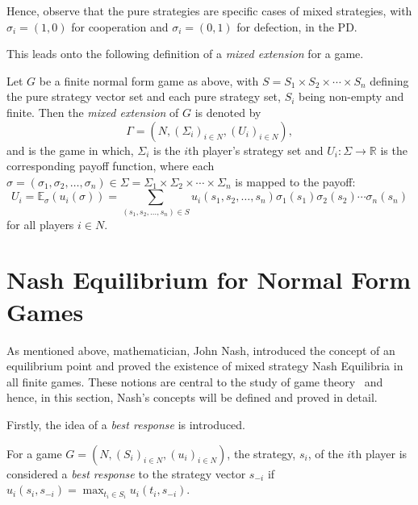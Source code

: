 Hence, observe that the pure
strategies are specific cases of mixed strategies, with \(\sigma_{i} = (1, 0)\)
for cooperation and \(\sigma_{i} = (0, 1)\) for defection, in the PD\@.

This leads onto the following definition of a \textit{mixed extension} for a
game.

\newpage
\begin{definition}
    Let \(G\) be a finite normal form game as above, with \(S = S_{1} \times
S_{2} \times \cdots \times S_{n}\) defining the pure strategy vector set and
each pure strategy set, \(S_{i}\) being non-empty and finite. Then the
\textit{mixed extension} of \(G\) is denoted by
\begin{equation}
    \Gamma = (N, {(\Sigma_{i})}_{i \in N}, {(U_{i})}_{i \in N}), 
\end{equation}
and is the game in which, \(\Sigma_{i}\) is the \(i\)th player's strategy set
and \(U_{i} : \Sigma \to \mathbb{R}\) is the corresponding payoff function,
where each \(\sigma = (\sigma_{1}, \sigma_{2}, \ldots, \sigma_{n}) \in \Sigma =
\Sigma_{1} \times \Sigma_{2} \times \cdots \times \Sigma_{n}\) is mapped to the
payoff:
\begin{equation}\label{eqn:mixed_payoff_function}
    U_{i} = \mathbb{E}_{\sigma}(u_{i}(\sigma)) = \sum_{(s_{1}, s_{2}, \ldots, s_
    {n}) \in S}{u_{i}(s_{1}, s_{2}, \ldots, s_{n})\sigma_{1}(s_{1})\sigma_{2}(s_
    {2})\cdots\sigma_{n}(s_{n})} 
\end{equation}
for all players \(i \in N\).
\end{definition}

\section{Nash Equilibrium for Normal Form Games}\label{sec:NE_for_Normal_Form_Games}
As mentioned above, mathematician, John Nash, introduced the concept of an
equilibrium point and proved the existence of mixed strategy Nash Equilibria in
all finite games. These notions are central to the study of game
theory~\cite{maschler_solan_zamir_2013} and hence, in this section, Nash's
concepts will be defined and proved in detail.

Firstly, the idea of a \textit{best response} is introduced.
\begin{definition}
    For a game \(G=(N, {(S_{i})}_{i \in N}, {(u_{i})}_{i \in N})\), the strategy,
\(s_{i}\), of the \(i\)th player is considered a \textit{best response} to the
strategy vector \(s_{-i}\) if \(u_{i}(s_{i}, s_{-i}) = \max_{t_{i} \in
S_{i}}u_{i}(t_{i}, s_{-i})\).
\end{definition}

